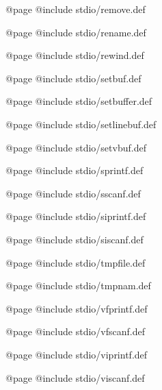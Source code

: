 @page
@include stdio/remove.def

@page
@include stdio/rename.def

@page
@include stdio/rewind.def

@page
@include stdio/setbuf.def

@page
@include stdio/setbuffer.def

@page
@include stdio/setlinebuf.def

@page
@include stdio/setvbuf.def

@page 
@include stdio/sprintf.def 

@page
@include stdio/sscanf.def 

@page 
@include stdio/siprintf.def 

@page 
@include stdio/siscanf.def 

@page
@include stdio/tmpfile.def

@page
@include stdio/tmpnam.def

@page 
@include stdio/vfprintf.def 

@page
@include stdio/vfscanf.def

@page 
@include stdio/viprintf.def 

@page 
@include stdio/viscanf.def 

